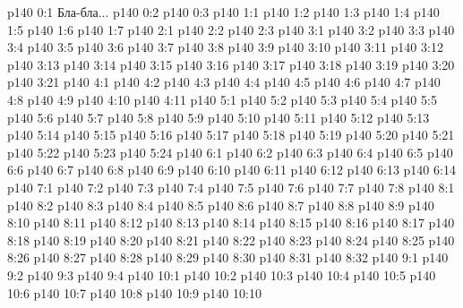 \author{Промежуточные создания}
\vs p140 0:1  Бла-бла...
\vs p140 0:2 
\vs p140 0:3 
\vs p140 1:1 
\vs p140 1:2 
\vs p140 1:3 
\vs p140 1:4 
\vs p140 1:5 
\vs p140 1:6 
\vs p140 1:7 
\vs p140 2:1 
\vs p140 2:2 
\vs p140 2:3 \pc 
{}
\vs p140 3:1 
\vs p140 3:2 
\vs p140 3:3 
\vs p140 3:4 
\vs p140 3:5 
\vs p140 3:6 
\vs p140 3:7 
\vs p140 3:8 
\vs p140 3:9 
\vs p140 3:10 
\vs p140 3:11 
\vs p140 3:12 
\vs p140 3:13 
\vs p140 3:14 
\vs p140 3:15 
\vs p140 3:16 
\vs p140 3:17 
\vs p140 3:18 
\vs p140 3:19 
\vs p140 3:20 
\vs p140 3:21 \pc 
{}
\vs p140 4:1 
\vs p140 4:2 \pc 
\vs p140 4:3 
\vs p140 4:4 \pc 
\vs p140 4:5 
\vs p140 4:6 
\vs p140 4:7 \pc 
\vs p140 4:8 \pc 
\vs p140 4:9 
\vs p140 4:10 
\vs p140 4:11 \pc 
{}
\vs p140 5:1 
\vs p140 5:2 
\vs p140 5:3 
\vs p140 5:4 \pc 
\vs p140 5:5 
\vs p140 5:6 
\vs p140 5:7 
\vs p140 5:8 
\vs p140 5:9 
\vs p140 5:10 \pc 
\vs p140 5:11 
\vs p140 5:12 
\vs p140 5:13 
\vs p140 5:14 
\vs p140 5:15 \pc 
\vs p140 5:16 
\vs p140 5:17 
\vs p140 5:18 
\vs p140 5:19 
\vs p140 5:20 
\vs p140 5:21 
\vs p140 5:22 
\vs p140 5:23 \pc 
\vs p140 5:24 \pc 
{}
\vs p140 6:1 
\vs p140 6:2 
\vs p140 6:3 
\vs p140 6:4 
\vs p140 6:5 
\vs p140 6:6 
\vs p140 6:7 
\vs p140 6:8 
\vs p140 6:9 
\vs p140 6:10 
\vs p140 6:11 
\vs p140 6:12 
\vs p140 6:13 
\vs p140 6:14 
\vs p140 7:1 
\vs p140 7:2 \pc 
\vs p140 7:3 
\vs p140 7:4 
\vs p140 7:5 
\vs p140 7:6 
\vs p140 7:7 \pc 
\vs p140 7:8 
\vs p140 8:1 
\vs p140 8:2 
\vs p140 8:3 
\vs p140 8:4 
\vs p140 8:5 
\vs p140 8:6 
\vs p140 8:7 
\vs p140 8:8 
\vs p140 8:9 
\vs p140 8:10 
\vs p140 8:11 
\vs p140 8:12 
\vs p140 8:13 
\vs p140 8:14 
\vs p140 8:15 
\vs p140 8:16 
\vs p140 8:17 
\vs p140 8:18 \pc 
\vs p140 8:19 
\vs p140 8:20 
\vs p140 8:21 
\vs p140 8:22 
\vs p140 8:23 \pc 
\vs p140 8:24 
\vs p140 8:25 
\vs p140 8:26 \pc 
\vs p140 8:27 
\vs p140 8:28 
\vs p140 8:29 
\vs p140 8:30 
\vs p140 8:31 
\vs p140 8:32 
\vs p140 9:1 
\vs p140 9:2 
\vs p140 9:3 
\vs p140 9:4 \pc 
{}
\vs p140 10:1 
\vs p140 10:2 \pc 
\vs p140 10:3 
\vs p140 10:4 \pc 
\vs p140 10:5 \pc 
\vs p140 10:6 
\vs p140 10:7 
\vs p140 10:8 
\vs p140 10:9 \pc 
\vs p140 10:10 \pc 
\quizlink

